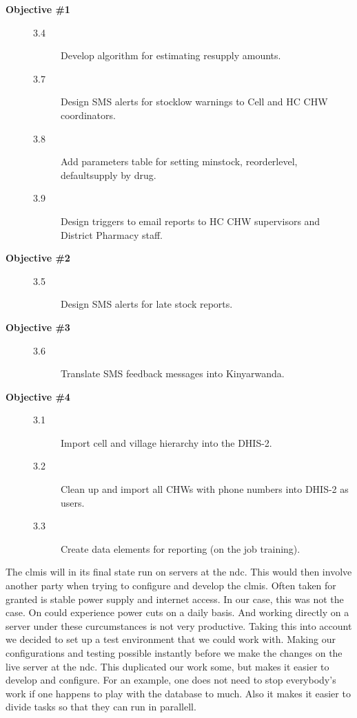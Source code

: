 \begin{description}
\item[\textbf{Objective \#1}]\hfill
	\begin{description}
	\item[3.4]Develop algorithm for estimating resupply amounts.
	\item[3.7]Design SMS alerts for stocklow warnings to Cell and HC CHW coordinators.
	\item[3.8]Add parameters table for setting minstock, reorderlevel, defaultsupply by drug.
	\item[3.9]Design triggers to email reports to HC CHW supervisors and District Pharmacy staff.
	\end{description}
\item[\textbf{Objective \#2}]\hfill
	\begin{description}
	\item[3.5]Design SMS alerts for late stock reports.
	\end{description}
\item[\textbf{Objective \#3}]\hfill
	\begin{description}
	\item[3.6]Translate SMS feedback messages into Kinyarwanda.
	\end{description}
\item[\textbf{Objective \#4}]\hfill 
	\begin{description}
	\item[3.1]Import cell and village hierarchy into the DHIS-2.
	\item[3.2]Clean up and import all CHWs with phone numbers into DHIS-2 as users.
	\item[3.3]Create data elements for reporting (on the job training).
	\end{description}

\end{description}

The \gls{clmis} will in its final state run on servers at the \gls{ndc}.
This would then involve another party when trying to configure and develop the \gls{clmis}. 
Often taken for granted is stable power supply and internet access. 
In our case, this was not the case. On could experience power cuts on a daily basis.
And working directly on a server under these curcumstances is not very productive. 
Taking this into account we decided to set up a test environment that we could work with. 
Making our configurations and testing possible instantly before we make the changes on the live server at the \gls{ndc}. 
This duplicated our work some, but makes it easier to develop and configure. For an example, one does not need to stop everybody's work if one happens to play with the database to much. Also it makes it easier to divide tasks so that they can run in parallell. 

